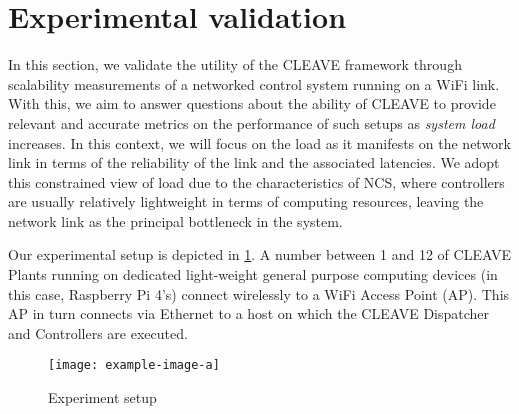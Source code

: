 \section{Experimental validation}\label{sec:experiments}

In this section, we validate the utility of the CLEAVE framework through scalability measurements of a networked control system running on a WiFi link.
With this, we aim to answer questions about the ability of CLEAVE to provide relevant and accurate metrics on the performance of such setups as \emph{system load} increases.
In this context, we will focus on the load as it manifests on the network link in terms of the reliability of the link and the associated latencies. 
We adopt this constrained view of load due to the characteristics of NCS, where controllers are usually relatively lightweight in terms of computing resources, leaving the network link as the principal bottleneck in the system.

Our experimental setup is depicted in \cref{fig:expsetup}.
A number between 1 and 12 of CLEAVE Plants running on dedicated light-weight general purpose computing devices (in this case, Raspberry Pi 4's) connect wirelessly to a WiFi Access Point (AP).
This AP in turn connects via Ethernet to a host on which the CLEAVE Dispatcher and Controllers are executed.

\begin{figure}
    \centering
    \texttt{[image: example-image-a]}
    \caption{Experiment setup}
    \label{fig:expsetup}
\end{figure}